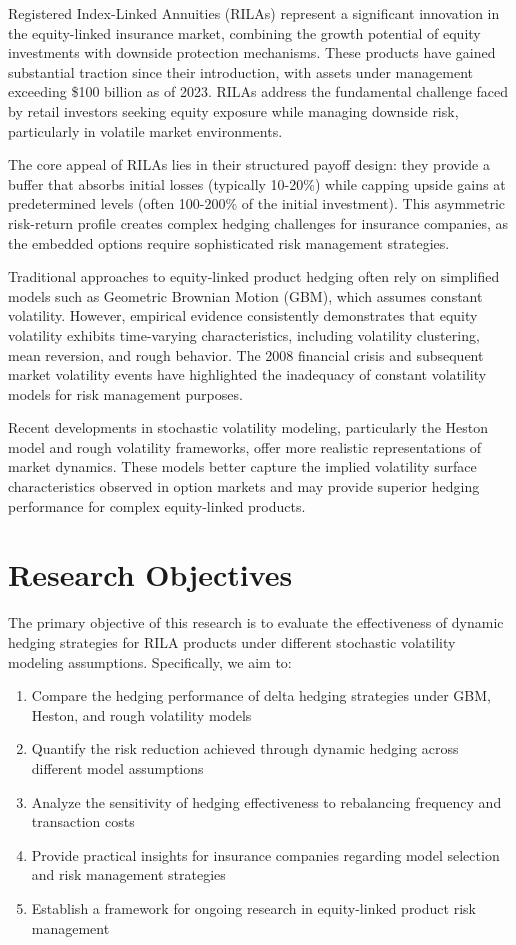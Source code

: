 \documentclass[12pt,a4paper]{report}
\begin{document}
Registered Index-Linked Annuities (RILAs) represent a significant innovation in the equity-linked insurance market, combining the growth potential of equity investments with downside protection mechanisms. These products have gained substantial traction since their introduction, with assets under management exceeding \$100 billion as of 2023. RILAs address the fundamental challenge faced by retail investors seeking equity exposure while managing downside risk, particularly in volatile market environments.

The core appeal of RILAs lies in their structured payoff design: they provide a buffer that absorbs initial losses (typically 10-20\%) while capping upside gains at predetermined levels (often 100-200\% of the initial investment). This asymmetric risk-return profile creates complex hedging challenges for insurance companies, as the embedded options require sophisticated risk management strategies.

Traditional approaches to equity-linked product hedging often rely on simplified models such as Geometric Brownian Motion (GBM), which assumes constant volatility. However, empirical evidence consistently demonstrates that equity volatility exhibits time-varying characteristics, including volatility clustering, mean reversion, and rough behavior. The 2008 financial crisis and subsequent market volatility events have highlighted the inadequacy of constant volatility models for risk management purposes.

Recent developments in stochastic volatility modeling, particularly the Heston model and rough volatility frameworks, offer more realistic representations of market dynamics. These models better capture the implied volatility surface characteristics observed in option markets and may provide superior hedging performance for complex equity-linked products.

\section{Research Objectives}

The primary objective of this research is to evaluate the effectiveness of dynamic hedging strategies for RILA products under different stochastic volatility modeling assumptions. Specifically, we aim to:

\begin{enumerate}
\item Compare the hedging performance of delta hedging strategies under GBM, Heston, and rough volatility models
\item Quantify the risk reduction achieved through dynamic hedging across different model assumptions
\item Analyze the sensitivity of hedging effectiveness to rebalancing frequency and transaction costs
\item Provide practical insights for insurance companies regarding model selection and risk management strategies
\item Establish a framework for ongoing research in equity-linked product risk management
\end{enumerate}
\end{document}
